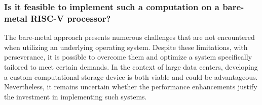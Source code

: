 \subsubsection*{Is it feasible to implement such a computation on a bare-metal
RISC-V processor?}
The bare-metal approach presents numerous challenges that are not encountered
when utilizing an underlying operating system. Despite these limitations, with
perseverance, it is possible to overcome them and optimize a system specifically
tailored to meet certain demands. In the context of large data centers,
developing a custom computational storage device is both viable and could be
advantageous. Nevertheless, it remains uncertain whether the performance
enhancements justify the investment in implementing such systems.


